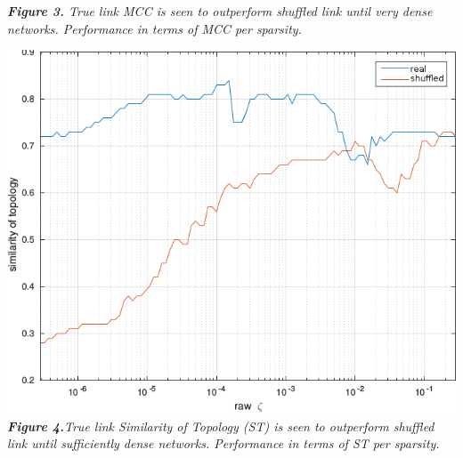 \documentclass[a0paper,portrait]{baposter}
\begin{document}
\begin{poster}
{\begin{minipage}[t]{0.33\textwidth}
\begin{center}
\small \textit{\textbf{Figure 3.} True link MCC is seen to outperform shuffled link until very dense networks. Performance in terms of MCC per sparsity.}
\end{center}
\end{minipage} 
\begin{minipage}[t]{0.33\textwidth} 
\begin{center}
\includegraphics[width=1\linewidth]{ST.png}\\
\small \textit{\textbf{Figure 4.}True link Similarity of Topology (ST) is seen to outperform shuffled link until sufficiently dense networks. Performance in terms of ST per sparsity.}\\ 
\end{center}
\end{minipage}  
}



\end{poster}
\end{document}
